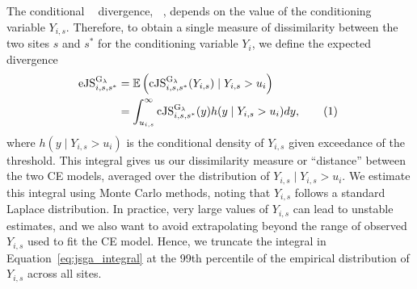 \documentclass[
  12pt]{article}
\newcommand{\JSGa}{\mathop{\mathrm{JS}^{\mathrm{G}_{\lambda}}}\nolimits}
\newcommand{\cJSGa}[1]{\mathop{\mathrm{cJS}_{i, #1}^{\mathrm{G}_{\lambda}}}\nolimits}
\newcommand{\eJSGa}[1]{\mathop{\mathrm{eJS}_{i, #1}^{\mathrm{G}_{\lambda}}}\nolimits}
\newcommand\numberthis{\addtocounter{equation}{1}\tag{\theequation}}
\begin{document}
The conditional $\JSGa{}$ divergence, $\cJSGa{}$, depends on the value of the conditioning variable $Y_{i,s}$.
Therefore, to obtain a single measure of dissimilarity between the two sites $s$ and $s^*$ for the conditioning variable $Y_i$, we define the expected divergence
\begin{align*}%
  \eJSGa{s, s^*} &= \mathbb{E}\left(\cJSGa{s, s^*}(Y_{i,s}) \mid Y_{i,s} > u_{i}\right) \\
                              &= \int_{u_{i,s}}^{\infty} \cJSGa{s, s^*}(y) h(y \mid Y_{i,s} > u_{i}) dy, \numberthis~\label{eq:jsga_integral}
\end{align*}  
where $h(y \mid Y_{i, s} > u_i)$ is the conditional density of $Y_{i, s}$ given exceedance of the threshold. 
This integral gives us our dissimilarity measure or ``distance'' between the two CE models, averaged over the distribution of $Y_{i, s} \mid Y_{i, s} > u_i$.
We estimate this integral using Monte Carlo methods, noting that $Y_{i, s}$ follows a standard Laplace distribution.
In practice, very large values of $Y_{i, s}$ can lead to unstable estimates, and we also want to avoid extrapolating beyond the range of observed $Y_{i, s}$ used to fit the CE model. 
Hence, we truncate the integral in Equation~\eqref{eq:jsga_integral} at the 99th percentile of the empirical distribution of $Y_{i, s}$ across all sites.
\end{document}
